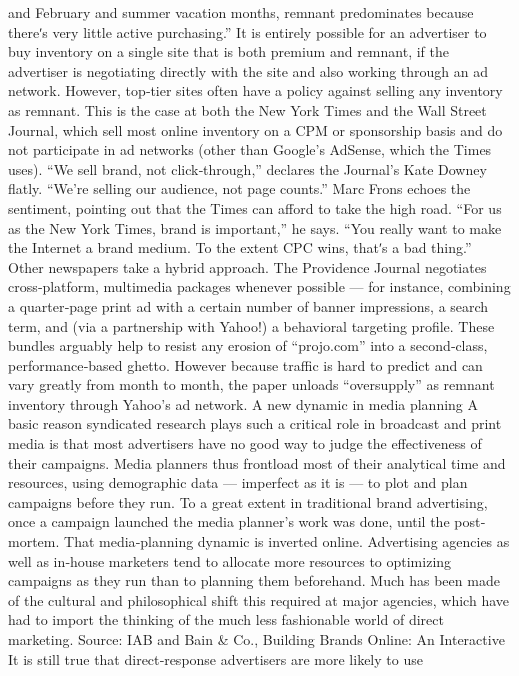 and February and summer vacation months, remnant predominates
because thereʹs very little active purchasing.''
It is entirely possible for an advertiser to buy inventory on a single site
that is both premium and remnant, if the advertiser is negotiating directly
with the site and also working through an ad network. However, top‐tier
sites often have a policy against selling any inventory as remnant.
This is the case at both the New York Times and the Wall Street Journal,
which sell most online inventory on a CPM or sponsorship basis and do
not participate in ad networks (other than Google’s AdSense, which the
Times uses). ``We sell brand, not click‐through,'' declares the Journal’s Kate
Downey flatly. ``We’re selling our audience, not page counts.''
Marc Frons echoes the sentiment, pointing out that the Times can afford to
take the high road. ``For us as the New York Times, brand is important,'' he
says. ``You really want to make the Internet a brand medium. To the
extent CPC wins, thatʹs a bad thing.''
Other newspapers take a hybrid approach. The Providence Journal
negotiates cross‐platform, multimedia packages whenever possible — for
instance, combining a quarter‐page print ad with a certain number of
banner impressions, a search term, and (via a partnership with Yahoo!) a
behavioral targeting profile. These bundles arguably help to resist any
erosion of ``projo.com'' into a second‐class, performance‐based ghetto.
However because traffic is hard to predict and can vary greatly from
month to month, the paper unloads ``oversupply'' as remnant inventory
through Yahoo’s ad network.
A new dynamic in media planning
A basic reason syndicated research plays such a critical role in broadcast
and print media is that most advertisers have no good way to judge the
effectiveness of their campaigns. Media planners thus frontload most of
their analytical time and resources, using demographic data — imperfect
as it is — to plot and plan campaigns before they run. To a great extent in
traditional brand advertising, once a campaign launched the media
planner’s work was done, until the post‐mortem.
That media‐planning dynamic is inverted online. Advertising agencies as
well as in‐house marketers tend to allocate more resources to optimizing
campaigns as they run than to planning them beforehand. Much has been
made of the cultural and philosophical shift this required at major
agencies, which have had to import the thinking of the much less
fashionable world of direct marketing.
Source: IAB and Bain & Co., Building Brands Online: An Interactive
It is still true that direct‐response advertisers are more likely to use
